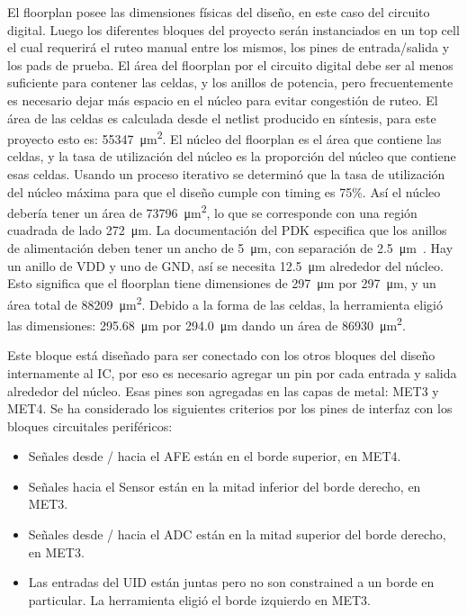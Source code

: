 \documentclass[a4paper, twoside, 11pt]{report}
\begin{document}
El floorplan posee las dimensiones físicas del diseño, en este caso del circuito digital. Luego los diferentes bloques del proyecto serán instanciados en un top cell el cual requerirá el ruteo manual entre los mismos, los pines de entrada/salida y los pads de prueba. El área del floorplan por el circuito digital debe ser al menos suficiente para contener las celdas, y los anillos de potencia, pero frecuentemente es necesario dejar más espacio en el núcleo para evitar congestión de ruteo. El área de las celdas es calculada desde el netlist producido en síntesis, para este proyecto esto es: \SI{55347}{\micro\meter\squared}. El núcleo del floorplan es el área que contiene las celdas, y la tasa de utilización del núcleo es la proporción del núcleo que contiene esas celdas. Usando un proceso iterativo se determinó que la tasa de utilización del núcleo máxima para que el diseño cumple con timing es 75\%. Así el núcleo debería tener un área de \SI{73796}{\micro\meter\squared}, lo que se corresponde con una región cuadrada de lado \SI{272}{\micro\meter}. La documentación del PDK especifica que los anillos de alimentación deben tener un ancho de \SI{5}{\micro\meter}, con separación de \SI{2.5}{\micro\meter}~\cite{dig_imp_guidelines}. Hay un anillo de VDD y uno de GND, así se necesita \SI{12.5}{\micro\meter} alrededor del núcleo. Esto significa que el floorplan tiene dimensiones de \SI{297}{\micro\meter} por \SI{297}{\micro\meter}, y un área total de \SI{88209}{\micro\meter\squared}. Debido a la forma de las celdas, la herramienta eligió las dimensiones: \SI{295.68}{\micro\meter} por \SI{294.0}{\micro\meter} dando un área de \SI{86930}{\micro\meter\squared}.

Este bloque está diseñado para ser conectado con los otros bloques del diseño internamente al IC, por eso es necesario agregar un pin por cada entrada y salida alrededor del núcleo. Esas pines son agregadas en las capas de metal: MET3 y MET4. Se ha considerado los siguientes criterios por los pines de interfaz con los bloques circuitales periféricos:

\begin{itemize}
  \item Señales desde / hacia el AFE están en el borde superior, en MET4.
  \item Señales hacia el Sensor están en la mitad inferior del borde derecho, en MET3.
  \item Señales desde / hacia el ADC están en la mitad superior del borde derecho, en MET3.
  \item Las entradas del UID están juntas pero no son constrained a un borde en particular. La herramienta eligió el borde izquierdo en MET3.
\end{itemize}
\end{document}
